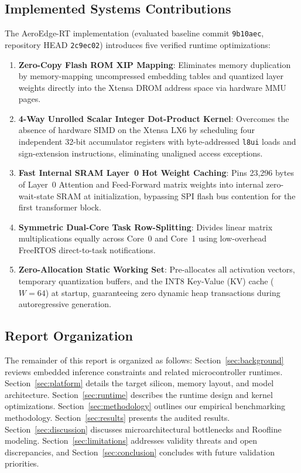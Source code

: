 \documentclass[10pt,a4paper]{article}
\begin{document}
\subsection{Implemented Systems Contributions}
The AeroEdge-RT implementation (evaluated baseline commit \texttt{9b10aec}, repository HEAD \texttt{2c9ec02}) introduces five verified runtime optimizations:
\begin{enumerate}
    \item \textbf{Zero-Copy Flash ROM XIP Mapping}: Eliminates memory duplication by memory-mapping uncompressed embedding tables and quantized layer weights directly into the Xtensa DROM address space via hardware MMU pages.
    \item \textbf{4-Way Unrolled Scalar Integer Dot-Product Kernel}: Overcomes the absence of hardware SIMD on the Xtensa LX6 by scheduling four independent 32-bit accumulator registers with byte-addressed \texttt{l8ui} loads and sign-extension instructions, eliminating unaligned access exceptions.
    \item \textbf{Fast Internal SRAM Layer~0 Hot Weight Caching}: Pins 23,296 bytes of Layer~0 Attention and Feed-Forward matrix weights into internal zero-wait-state SRAM at initialization, bypassing SPI flash bus contention for the first transformer block.
    \item \textbf{Symmetric Dual-Core Task Row-Splitting}: Divides linear matrix multiplications equally across Core~0 and Core~1 using low-overhead FreeRTOS direct-to-task notifications.
    \item \textbf{Zero-Allocation Static Working Set}: Pre-allocates all activation vectors, temporary quantization buffers, and the INT8 Key-Value (KV) cache ($W=64$) at startup, guaranteeing zero dynamic heap transactions during autoregressive generation.
\end{enumerate}

\subsection{Report Organization}
The remainder of this report is organized as follows: Section~\ref{sec:background} reviews embedded inference constraints and related microcontroller runtimes. Section~\ref{sec:platform} details the target silicon, memory layout, and model architecture. Section~\ref{sec:runtime} describes the runtime design and kernel optimizations. Section~\ref{sec:methodology} outlines our empirical benchmarking methodology. Section~\ref{sec:results} presents the audited results. Section~\ref{sec:discussion} discusses microarchitectural bottlenecks and Roofline modeling. Section~\ref{sec:limitations} addresses validity threats and open discrepancies, and Section~\ref{sec:conclusion} concludes with future validation priorities.
\end{document}
